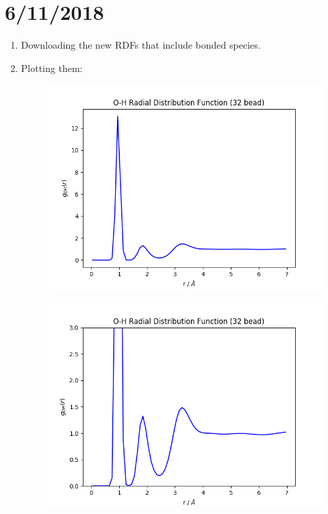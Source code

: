 \documentclass[12pt,reqno]{amsart}
\numberwithin{equation}{section}
\begin{document}
\section{6/11/2018}
\begin{enumerate}
\item Downloading the new RDFs that include bonded species.
\item Plotting them:

\begin{figure}[H]
\centering
\includegraphics[scale=0.6]{0_1-32bead-bonded-tip4pF.png}
\end{figure}

\begin{figure}[H]
\centering
\includegraphics[scale=0.6]{0_1-32bead-bonded-tip4pF_1.png}
\end{figure}


\end{enumerate}
\end{document}

